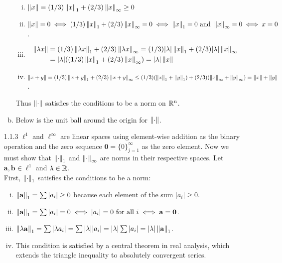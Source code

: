 \documentclass[../../Solutions.tex]{subfiles}
\begin{document}
\begin{itemize}
\begin{enumerate}[(a)]
				\begin{enumerate}[(i)]
					\item $\left\lVert x\right\rVert = (1/3)\left\lVert x\right\rVert_1+(2/3)\left\lVert x\right\rVert_\infty \geq 0$
					\item $\left\lVert x\right\rVert = 0 \iff (1/3)\left\lVert x\right\rVert_1+(2/3)\left\lVert x\right\rVert_\infty = 0 \iff \left\lVert x\right\rVert_1 = 0 \text{ and } \left\lVert x\right\rVert_\infty = 0 \iff x = 0$.
					\item \begin{equation*} \begin{split}
						 \left\lVert\lambda x\right\rVert & = (1/3)\left\lVert\lambda x\right\rVert_1+(2/3)\left\lVert\lambda x\right\rVert_\infty = (1/3)|\lambda|\left\lVert x\right\rVert_1+(2/3)|\lambda|\left\lVert x\right\rVert_\infty \\
							 & = |\lambda|((1/3)\left\lVert x\right\rVert_1+(2/3)\left\lVert x\right\rVert_\infty) = |\lambda|\left\lVert x\right\rVert
					\end{split} \end{equation*}
					\item $\left\lVert x+y\right\rVert = (1/3)\left\lVert x+y\right\rVert_1+(2/3)\left\lVert x+y\right\rVert_\infty \leq (1/3)(\left\lVert x\right\rVert_1+\left\lVert y\right\rVert_1)+(2/3)(\left\lVert x\right\rVert_\infty+\left\lVert y\right\rVert_\infty) = \left\lVert x\right\rVert+\left\lVert y\right\rVert$.
				\end{enumerate}
				Thus $\left\lVert\cdot\right\rVert$ satisfies the conditions to be a norm on $\mathbb{R}^n$.
			\item Below is the unit ball around the origin for $\left\lVert\cdot\right\rVert$.
			\begin{figure}[h]
				\begin{center}
					
				\end{center}
			\end{figure}
		\end{enumerate}
	
	\item [1.1.3] $\ell^1$ and $\ell^\infty$ are linear spaces using element-wise addition as the binary operation and the zero sequence $\mathbf{0} = \{0\}_{j=1}^\infty$ as the zero element.
	Now we must show that $\left\lVert\cdot\right\rVert_1$ and $\left\lVert\cdot\right\rVert_\infty$ are norms in their respective spaces.
	Let $\mathbf{a},\mathbf{b} \in \ell^1$ and $\lambda \in \mathbb{R}$. \\
	First, $\left\lVert\cdot\right\rVert_1$ satisfies the conditions to be a norm:
	\begin{enumerate}[(i)]
		\item $\left\lVert\mathbf{a}\right\rVert_1 = \sum | a_i | \geq 0$ because each element of the sum $|a_i| \geq 0$.
		\item $\left\lVert\mathbf{a}\right\rVert_1 = \sum | a_i | = 0 \iff |a_i| = 0 \text{ for all } i \iff \mathbf{a} = \mathbf{0}$.
		\item $\left\lVert\lambda\mathbf{a}\right\rVert_1 = \sum | \lambda a_i | = \sum |\lambda||a_i| = |\lambda|\sum |a_i| = |\lambda|\left\lVert\mathbf{a}\right\rVert_1$.
		\item This condition is satisfied by a central theorem in real analysis, which extends the triangle inequality to absolutely convergent series.
	\end{enumerate}
	

\end{itemize}
\end{document}
